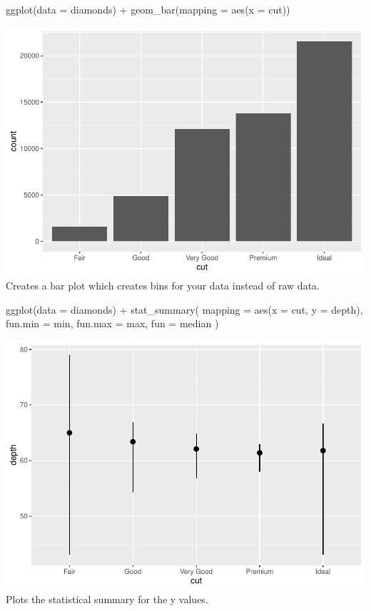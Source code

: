 \documentclass[
]{article}
\newenvironment{Shaded}{\begin{snugshade}}{\end{snugshade}}
\newcommand{\AttributeTok}[1]{\textcolor[rgb]{0.77,0.63,0.00}{#1}}
\newcommand{\FunctionTok}[1]{\textcolor[rgb]{0.00,0.00,0.00}{#1}}
\newcommand{\NormalTok}[1]{#1}
\newcommand{\SpecialCharTok}[1]{\textcolor[rgb]{0.00,0.00,0.00}{#1}}
\begin{document}
\begin{Shaded}
\begin{Highlighting}[]
\FunctionTok{ggplot}\NormalTok{(}\AttributeTok{data =}\NormalTok{ diamonds) }\SpecialCharTok{+} 
  \FunctionTok{geom\_bar}\NormalTok{(}\AttributeTok{mapping =} \FunctionTok{aes}\NormalTok{(}\AttributeTok{x =}\NormalTok{ cut))}
\end{Highlighting}
\end{Shaded}

\includegraphics{Assignments_files/figure-latex/unnamed-chunk-46-1.pdf}
Creates a bar plot which creates bins for your data instead of raw data.

\begin{Shaded}
\begin{Highlighting}[]
\FunctionTok{ggplot}\NormalTok{(}\AttributeTok{data =}\NormalTok{ diamonds) }\SpecialCharTok{+} 
  \FunctionTok{stat\_summary}\NormalTok{(}
    \AttributeTok{mapping =} \FunctionTok{aes}\NormalTok{(}\AttributeTok{x =}\NormalTok{ cut, }\AttributeTok{y =}\NormalTok{ depth),}
    \AttributeTok{fun.min =}\NormalTok{ min,}
    \AttributeTok{fun.max =}\NormalTok{ max,}
    \AttributeTok{fun =}\NormalTok{ median}
\NormalTok{  )}
\end{Highlighting}
\end{Shaded}

\includegraphics{Assignments_files/figure-latex/unnamed-chunk-47-1.pdf}
Plots the statistical summary for the y values.
\end{document}

